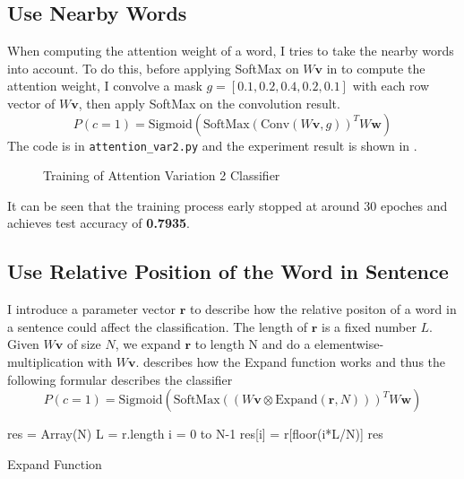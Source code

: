 \documentclass{article}
\begin{document}
\subsection{Use Nearby Words}
When computing the attention weight of a word, I tries to take the nearby words into account. To do this, before applying SoftMax on $W\textbf{v}$ in  to compute the attention weight, I convolve a mask $g = [0.1,0.2,0.4,0.2,0.1]$ with each row vector of $W\textbf{v}$, then apply SoftMax on the convolution result. 
\[
P(c=1) = \text{Sigmoid}(\text{SoftMax}(\text{Conv}(W \textbf{v},g))^TW \textbf{w})
\]
 The code is in \texttt{attention\_var2.py} and the experiment result is shown in .
\begin{figure}
\centering
{}
\caption{Training of Attention Variation 2 Classifier}
\label{fig:var2}
\end{figure}
It can be seen that the training process early stopped at around 30 epoches and achieves test accuracy of \textbf{0.7935}.

\subsection{Use Relative Position of the Word in Sentence}
I introduce a parameter vector $\textbf{r}$ to describe how the relative positon of a word in a sentence could affect the classification. The length of $\textbf{r}$ is a fixed number $L$. Given $W\textbf{v}$ of size $N$, we expand $\textbf{r}$ to length N and do a elementwise-multiplication with $W\textbf{v}$.  describes how the Expand function works and thus the following formular describes the classifier
 \[
P(c=1) = \text{Sigmoid}(\text{SoftMax}((W \textbf{v}\otimes\text{Expand}(\textbf{r},N)))^TW \textbf{w})
\]

\begin{algorithm}
\begin{algorithmic}
\State res = Array(N)
\State L = r.length
\For i = 0 to N-1
\State res[i] = r[floor(i*L/N)]
\EndFor
\Return res
\EndFunction
\end{algorithmic}
\caption{Expand Function}
\label{algo:expand}
\end{algorithm}
\end{document}
